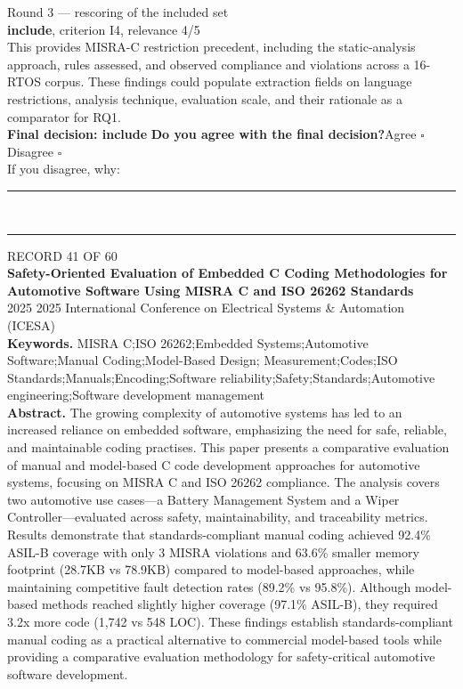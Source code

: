 \documentclass[11pt,a4paper]{article}
\begin{document}
{\footnotesize\color{soft}Round 3 --- rescoring of the included set}\\[0.5mm]
{\small\textbf{include}, criterion I4, relevance 4/5}\\[0.5mm]
{\small This provides MISRA-C restriction precedent, including the static-analysis approach, rules assessed, and observed compliance and violations across a 16-RTOS corpus. These findings could populate extraction fields on language restrictions, analysis technique, evaluation scale, and their rationale as a comparator for RQ1.}\\[2.5mm]
{\small\textbf{Final decision: include}}
\vspace{2mm}
{\small\textbf{Do you agree with the final decision?}\quad{}Agree $\square$\qquad{}Disagree $\square$}\\[1mm]
{\footnotesize\color{soft}If you disagree, why:}\\[1mm]
\color{rule}\rule{\linewidth}{0.3pt}\\[3mm]\rule{\linewidth}{0.3pt}\color{black}
\clearpage
{\color{soft}\footnotesize RECORD 41 OF 60}\\[1mm]
{\large\bfseries Safety-Oriented Evaluation of Embedded C Coding Methodologies for Automotive Software Using MISRA C and ISO 26262 Standards}\\[1.5mm]
{\color{soft}\small 2025 \textperiodcentered{} 2025 International Conference on Electrical Systems \& Automation (ICESA)}\\[2mm]
{\small\textbf{Keywords.} MISRA C;ISO 26262;Embedded Systems;Automotive Software;Manual Coding;Model-Based Design; Measurement;Codes;ISO Standards;Manuals;Encoding;Software reliability;Safety;Standards;Automotive engineering;Software development management}\\[2mm]
{\small\textbf{Abstract.} The growing complexity of automotive systems has led to an increased reliance on embedded software, emphasizing the need for safe, reliable, and maintainable coding practises. This paper presents a comparative evaluation of manual and model-based C code development approaches for automotive systems, focusing on MISRA C and ISO 26262 compliance. The analysis covers two automotive use cases---a Battery Management System and a Wiper Controller---evaluated across safety, maintainability, and traceability metrics. Results demonstrate that standards-compliant manual coding achieved 92.4\% ASIL-B coverage with only 3 MISRA violations and 63.6\% smaller memory footprint (28.7KB vs 78.9KB) compared to model-based approaches, while maintaining competitive fault detection rates (89.2\% vs 95.8\%). Although model-based methods reached slightly higher coverage (97.1\% ASIL-B), they required 3.2x more code (1,742 vs 548 LOC). These findings establish standards-compliant manual coding as a practical alternative to commercial model-based tools while providing a comparative evaluation methodology for safety-critical automotive software development.}
\end{document}
